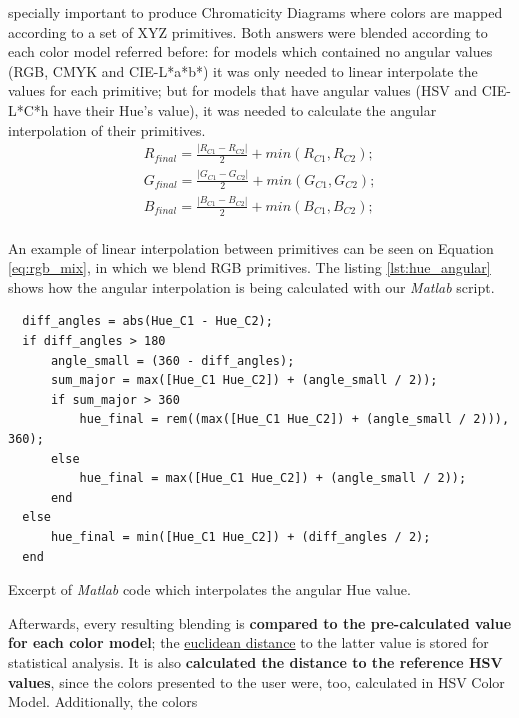 specially important to produce Chromaticity Diagrams where colors are mapped according to a set of XYZ primitives. Both answers were blended according to each color model referred before:
for models which contained no angular values (RGB, CMYK and CIE-L*a*b*) it was only needed to linear interpolate the values for each primitive; but for models that have angular values (HSV and CIE-L*C*h have their Hue's value), it was
needed to calculate the angular interpolation of their primitives.
%
\small
\begin{equation}
  \label{eq:rgb_mix}
  \begin{aligned}
    R_{final} = \frac{|R_{C1} - R_{C2}|}{2} + min(R_{C1}, R_{C2}); \\
    G_{final} = \frac{|G_{C1} - G_{C2}|}{2} + min(G_{C1}, G_{C2}); \\
    B_{final} = \frac{|B_{C1} - B_{C2}|}{2} + min(B_{C1}, B_{C2}); \\
  \end{aligned}
\end{equation} \par
\normalsize
%
An example of linear interpolation between primitives can be seen on Equation \ref{eq:rgb_mix}, in which we blend \gls{RGB} primitives. The listing \ref{lst:hue_angular} shows
how the angular interpolation is being calculated with our \emph{Matlab} script. \\
%
\begin{listing}[htbp]
  \setlength{\belowcaptionskip}{5pt plus 2pt minus 2pt}
  \begin{verbatim}
  diff_angles = abs(Hue_C1 - Hue_C2);
  if diff_angles > 180
      angle_small = (360 - diff_angles);
      sum_major = max([Hue_C1 Hue_C2]) + (angle_small / 2));
      if sum_major > 360
          hue_final = rem((max([Hue_C1 Hue_C2]) + (angle_small / 2))), 360);
      else
          hue_final = max([Hue_C1 Hue_C2]) + (angle_small / 2));
      end
  else
      hue_final = min([Hue_C1 Hue_C2]) + (diff_angles / 2);
  end
  \end{verbatim}
  \caption{Excerpt of \emph{Matlab} code which interpolates the angular Hue value.}
  \vspace{-15pt}
  \label{lst:hue_angular}
\end{listing}
%
Afterwards, every resulting blending is \textbf{compared to the pre-calculated value for each color model}; the \ul{euclidean distance} to the latter value is stored for statistical analysis. It is
also \textbf{calculated the distance to the reference HSV values}, since the colors presented to the user were, too, calculated in HSV Color Model. Additionally, the colors
